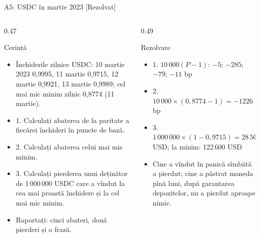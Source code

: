 \begin{frame}{A5: USDC în martie 2023 [Rezolvat]}
\itemsize{\scriptsize}
\begin{columns}[T]
\begin{column}{0.47\textwidth}
\begin{block}{Cerință}
\begin{itemize}
    \item Închiderile zilnice USDC: 10 martie 2023 0{,}9995, 11 martie 0{,}9715, 12 martie 0{,}9921, 13 martie 0{,}9989; cel mai mic minim zilnic 0{,}8774 (11 martie).
    \item 1. Calculați abaterea de la paritate a fiecărei închideri în puncte de bază.
    \item 2. Calculați abaterea celui mai mic minim.
    \item 3. Calculați pierderea unui deținător de 1\,000\,000 USDC care a vîndut la cea mai proastă închidere și la cel mai mic minim.
    \item Raportați: cinci abateri, două pierderi și o frază.
\end{itemize}
\end{block}
\end{column}
\begin{column}{0.49\textwidth}
\begin{exampleblock}{Rezolvare}
\begin{itemize}
    \item 1. $10\,000(P - 1)$: $-5$; $-285$; $-79$; $-11$ bp
    \item 2. $10\,000 \times (0{,}8774 - 1) = -1226$ bp
    \item 3. $1\,000\,000 \times (1 - 0{,}9715) = 28\,500$ USD; la minim: 122\,600 USD
    \item Cine a vîndut în panică sîmbătă a pierdut; cine a păstrat moneda pînă luni, după garantarea depozitelor, nu a pierdut aproape nimic.
\end{itemize}
\end{exampleblock}
\end{column}
\end{columns}
\end{frame}

